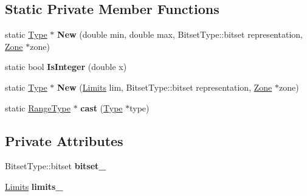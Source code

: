 \subsection*{Static Private Member Functions}
\begin{DoxyCompactItemize}
\item 
static \hyperlink{classv8_1_1internal_1_1_type}{Type} $\ast$ {\bfseries New} (double min, double max, Bitset\+Type\+::bitset representation, \hyperlink{classv8_1_1internal_1_1_zone}{Zone} $\ast$zone)\hypertarget{classv8_1_1internal_1_1_range_type_abfaba4aae49b64597c1587977eb55de6}{}\label{classv8_1_1internal_1_1_range_type_abfaba4aae49b64597c1587977eb55de6}

\item 
static bool {\bfseries Is\+Integer} (double x)\hypertarget{classv8_1_1internal_1_1_range_type_af11d536c6d5c512b0cf68cfcc1cca519}{}\label{classv8_1_1internal_1_1_range_type_af11d536c6d5c512b0cf68cfcc1cca519}

\item 
static \hyperlink{classv8_1_1internal_1_1_type}{Type} $\ast$ {\bfseries New} (\hyperlink{structv8_1_1internal_1_1_range_type_1_1_limits}{Limits} lim, Bitset\+Type\+::bitset representation, \hyperlink{classv8_1_1internal_1_1_zone}{Zone} $\ast$zone)\hypertarget{classv8_1_1internal_1_1_range_type_ae937285d1ec7f0ac5700bd33a08b0790}{}\label{classv8_1_1internal_1_1_range_type_ae937285d1ec7f0ac5700bd33a08b0790}

\item 
static \hyperlink{classv8_1_1internal_1_1_range_type}{Range\+Type} $\ast$ {\bfseries cast} (\hyperlink{classv8_1_1internal_1_1_type}{Type} $\ast$type)\hypertarget{classv8_1_1internal_1_1_range_type_ac860f9d0ed018de00757770411003b33}{}\label{classv8_1_1internal_1_1_range_type_ac860f9d0ed018de00757770411003b33}

\end{DoxyCompactItemize}
\subsection*{Private Attributes}
\begin{DoxyCompactItemize}
\item 
Bitset\+Type\+::bitset {\bfseries bitset\+\_\+}\hypertarget{classv8_1_1internal_1_1_range_type_ab4666aa872c6c402ab448cfb6632a00f}{}\label{classv8_1_1internal_1_1_range_type_ab4666aa872c6c402ab448cfb6632a00f}

\item 
\hyperlink{structv8_1_1internal_1_1_range_type_1_1_limits}{Limits} {\bfseries limits\+\_\+}\hypertarget{classv8_1_1internal_1_1_range_type_a265be856efa9dfaa481368855f25b610}{}\label{classv8_1_1internal_1_1_range_type_a265be856efa9dfaa481368855f25b610}

\end{DoxyCompactItemize}
